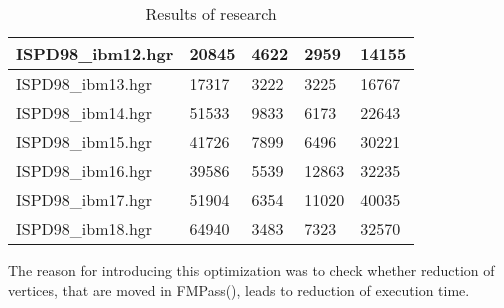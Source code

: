 \documentclass[12pt,a4paper,twocolumn]{article}
\begin{document}
\begin{table}[]
\begin{tabular}{|l|ll|ll|}
			ISPD98\_ibm12.hgr & \multicolumn{1}{l|}{20845}        & 4622           & \multicolumn{1}{l|}{2959}         & 14155          \\ \hline
			ISPD98\_ibm13.hgr & \multicolumn{1}{l|}{17317}        & 3222           & \multicolumn{1}{l|}{3225}         & 16767          \\ \hline
			ISPD98\_ibm14.hgr & \multicolumn{1}{l|}{51533}        & 9833           & \multicolumn{1}{l|}{6173}         & 22643          \\ \hline
			ISPD98\_ibm15.hgr & \multicolumn{1}{l|}{41726}        & 7899           & \multicolumn{1}{l|}{6496}         & 30221          \\ \hline
			ISPD98\_ibm16.hgr & \multicolumn{1}{l|}{39586}        & 5539           & \multicolumn{1}{l|}{12863}        & 32235          \\ \hline
			ISPD98\_ibm17.hgr & \multicolumn{1}{l|}{51904}        & 6354           & \multicolumn{1}{l|}{11020}        & 40035          \\ \hline
			ISPD98\_ibm18.hgr & \multicolumn{1}{l|}{64940}        & 3483           & \multicolumn{1}{l|}{7323}         & 32570          \\ \hline
		\end{tabular}
		\caption{Results of research}
		\label{tab:res}
	\end{table}

	The reason for introducing this optimization was to check whether reduction of vertices, that are moved in FMPass(), leads to reduction of execution time. 
	
\end{document}
